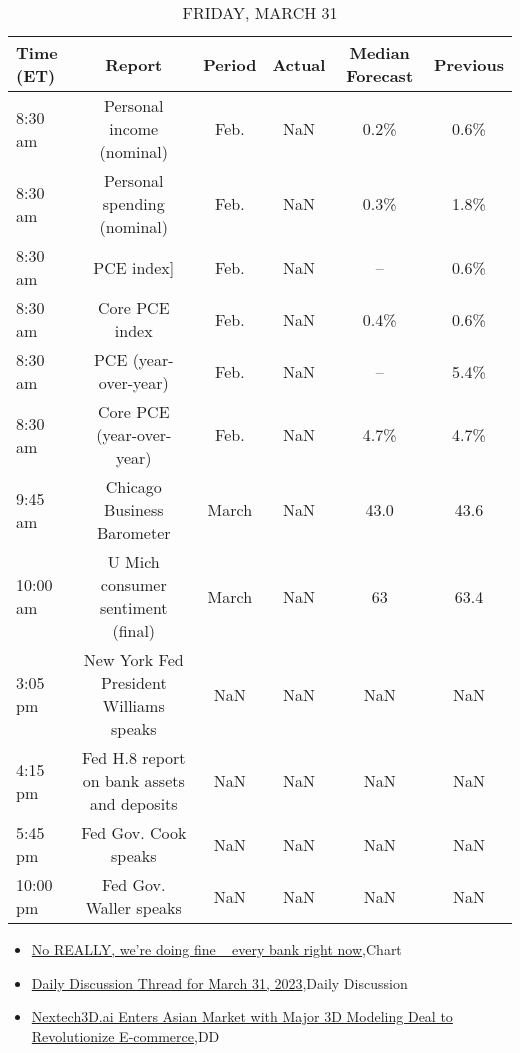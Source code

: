 \documentclass{article}%
\begin{document}
%


\begin{table}[htbp]%
\caption{FRIDAY, MARCH 31}%
\centering%
\begin{adjustbox}{width=1\textwidth}%
\begin{tabular}{lccccc}
\toprule
Time (ET) &                                     Report & Period & Actual & Median Forecast & Previous \\
\midrule
  8:30 am &                  Personal income (nominal) &   Feb. &    NaN &            0.2\% &     0.6\% \\
  8:30 am &                Personal spending (nominal) &   Feb. &    NaN &            0.3\% &     1.8\% \\
  8:30 am &                                 PCE index] &   Feb. &    NaN &              -- &     0.6\% \\
  8:30 am &                             Core PCE index &   Feb. &    NaN &            0.4\% &     0.6\% \\
  8:30 am &                       PCE (year-over-year) &   Feb. &    NaN &              -- &     5.4\% \\
  8:30 am &                  Core PCE (year-over-year) &   Feb. &    NaN &            4.7\% &     4.7\% \\
  9:45 am &                 Chicago Business Barometer &  March &    NaN &            43.0 &     43.6 \\
 10:00 am &          U Mich consumer sentiment (final) &  March &    NaN &              63 &     63.4 \\
  3:05 pm &     New York Fed President Williams speaks &    NaN &    NaN &             NaN &      NaN \\
  4:15 pm & Fed H.8 report on bank assets and deposits &    NaN &    NaN &             NaN &      NaN \\
  5:45 pm &                       Fed Gov. Cook speaks &    NaN &    NaN &             NaN &      NaN \\
 10:00 pm &                     Fed Gov. Waller speaks &    NaN &    NaN &             NaN &      NaN \\
\bottomrule
\end{tabular}
%
\end{adjustbox}%
\end{table}

%
\begin{itemize}%
\item%
\href{https://reddit.com/r/wallstreetbets/comments/127ifsn/no\_really\_were\_doing\_fine\_every\_bank\_right\_now/}{No REALLY, we're doing fine ~ every bank right now},Chart%
\item%
\href{https://reddit.com/r/wallstreetbets/comments/127gd31/daily\_discussion\_thread\_for\_march\_31\_2023/}{Daily Discussion Thread for March 31, 2023},Daily Discussion%
\item%
\href{https://reddit.com/r/Baystreetbets/comments/126mvqc/nextech3dai\_enters\_asian\_market\_with\_major\_3d/}{Nextech3D.ai Enters Asian Market with Major 3D Modeling Deal to Revolutionize E-commerce},DD%
\end{itemize}%
\end{document}
